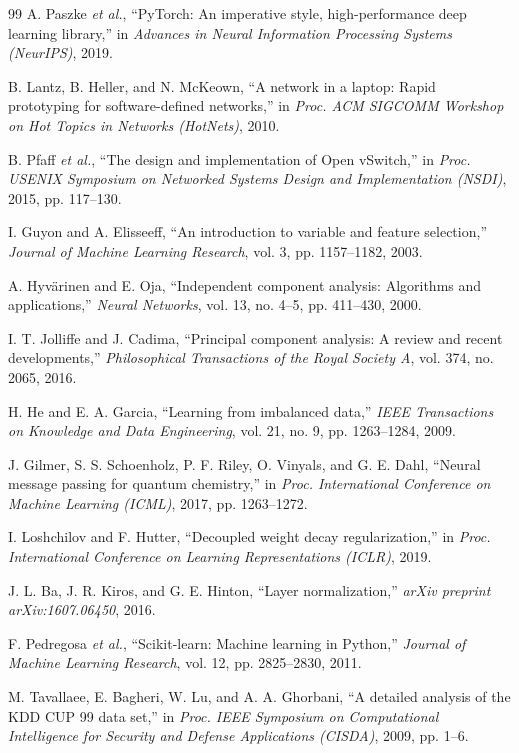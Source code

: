 \begin{thebibliography}{99}
 A. Paszke \textit{et al.}, ``PyTorch: An imperative style, high-performance deep learning library,'' in \textit{Advances in Neural Information Processing Systems (NeurIPS)}, 2019.

 B. Lantz, B. Heller, and N. McKeown, ``A network in a laptop: Rapid prototyping for software-defined networks,'' in \textit{Proc. ACM SIGCOMM Workshop on Hot Topics in Networks (HotNets)}, 2010.

 B. Pfaff \textit{et al.}, ``The design and implementation of Open vSwitch,'' in \textit{Proc. USENIX Symposium on Networked Systems Design and Implementation (NSDI)}, 2015, pp. 117--130.

 I. Guyon and A. Elisseeff, ``An introduction to variable and feature selection,'' \textit{Journal of Machine Learning Research}, vol. 3, pp. 1157--1182, 2003.

 A. Hyv\"{a}rinen and E. Oja, ``Independent component analysis: Algorithms and applications,'' \textit{Neural Networks}, vol. 13, no. 4--5, pp. 411--430, 2000.

 I. T. Jolliffe and J. Cadima, ``Principal component analysis: A review and recent developments,'' \textit{Philosophical Transactions of the Royal Society A}, vol. 374, no. 2065, 2016.

 H. He and E. A. Garcia, ``Learning from imbalanced data,'' \textit{IEEE Transactions on Knowledge and Data Engineering}, vol. 21, no. 9, pp. 1263--1284, 2009.

 J. Gilmer, S. S. Schoenholz, P. F. Riley, O. Vinyals, and G. E. Dahl, ``Neural message passing for quantum chemistry,'' in \textit{Proc. International Conference on Machine Learning (ICML)}, 2017, pp. 1263--1272.

 I. Loshchilov and F. Hutter, ``Decoupled weight decay regularization,'' in \textit{Proc. International Conference on Learning Representations (ICLR)}, 2019.

 J. L. Ba, J. R. Kiros, and G. E. Hinton, ``Layer normalization,'' \textit{arXiv preprint arXiv:1607.06450}, 2016.

 F. Pedregosa \textit{et al.}, ``Scikit-learn: Machine learning in Python,'' \textit{Journal of Machine Learning Research}, vol. 12, pp. 2825--2830, 2011.

 M. Tavallaee, E. Bagheri, W. Lu, and A. A. Ghorbani, ``A detailed analysis of the KDD CUP 99 data set,'' in \textit{Proc. IEEE Symposium on Computational Intelligence for Security and Defense Applications (CISDA)}, 2009, pp. 1--6.


\end{thebibliography}
